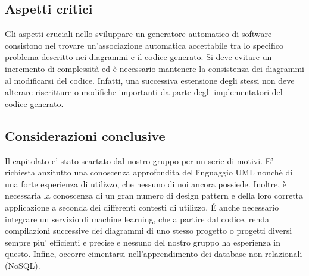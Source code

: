 \subsection{Aspetti critici}

Gli aspetti cruciali nello sviluppare un generatore automatico di
software consistono nel trovare un'associazione automatica accettabile
tra lo specifico problema descritto nei diagrammi e il codice generato. Si deve evitare un incremento di complessità ed è necessario mantenere la consistenza dei diagrammi al modificarsi del codice. Infatti, una successiva estensione degli stessi non deve alterare riscritture o modifiche importanti da parte degli implementatori del codice generato.

\subsection{Considerazioni conclusive}

Il capitolato e' stato scartato dal nostro gruppo per un serie di
motivi. E' richiesta anzitutto una conoscenza approfondita del linguaggio
UML nonchè di una forte esperienza di utilizzo, che nessuno di noi ancora possiede. Inoltre, è necessaria la conoscenza di un gran numero di design
pattern e della loro corretta applicazione a seconda dei differenti contesti di utilizzo. \'{E} anche necessario integrare un servizio
di machine learning, che a partire dal codice, renda compilazioni
successive dei diagrammi di uno stesso progetto o progetti diversi
sempre piu' efficienti e precise e nessuno del nostro gruppo ha esperienza
in questo. Infine, occorre cimentarsi nell'apprendimento dei database non relazionali (NoSQL). 